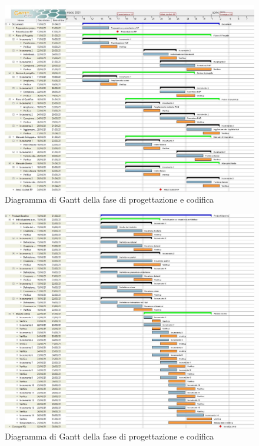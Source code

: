 \documentclass[../piano_di_progetto.tex]{subfiles}
\begin{document}
\begin{figure}[H]
\centering
\includegraphics[width=18cm]{src/img/gantt/pianificazione_iniz_documenti.jpg}
\caption{Diagramma di Gantt della fase di progettazione e codifica}
\end{figure}

\begin{figure}[H]
    \centering
    \includegraphics[width=18cm]{src/img/gantt/pianificazione_iniz_pb.jpg}
    \caption{Diagramma di Gantt della fase di progettazione e codifica}
    \end{figure}
\end{document}
